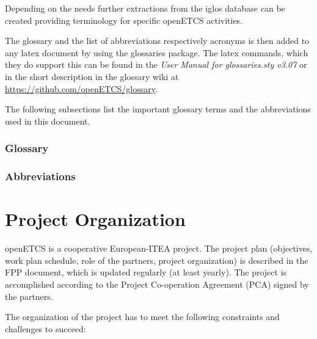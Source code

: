 \documentclass{template/openetcs_article}
\begin{document}
Depending on the needs further extractions from the iglos database can be created providing terminology for specific openETCS activities.

The glossary and the list of abbreviations respectively acronyms is then added to any latex document by using the glossaries package. The latex commands, which they do support this can be found in the \textit{User Manual for glossaries.sty v3.07} or in the short description in the glossary wiki at \url{https://github.com/openETCS/glossary}.

The following subsections list the important glossary terms and the abbreviations used in this document. 

\subsubsection{Glossary}

\printglossary[title=]


\subsubsection{Abbreviations}

\printglossary[type=\acronymtype,title=]


\newpage

\section{Project Organization}

openETCS is a cooperative European-ITEA project. The project plan (objectives, work plan schedule, role of the partners, project organization) is described in the \citep{fpp} FPP document, which is updated regularly (at least yearly). The project is accomplished according to the Project Co-operation Agreement (PCA) \citep{PCA} signed by the partners.

The organization of the project has to meet the following constraints and challenges to succeed:
\end{document}
